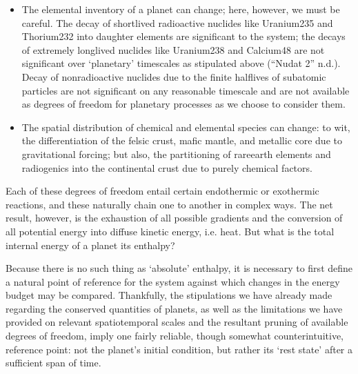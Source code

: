 \documentclass[letterpaper,10pt,english]{jupyterBook}
\begin{document}
\begin{itemize}
\item {} 
\sphinxAtStartPar
The elemental inventory of a planet can change; here, however, we must be careful. The decay of short\sphinxhyphen{}lived radioactive nuclides like Uranium\sphinxhyphen{}235 and Thorium\sphinxhyphen{}232 into daughter elements are significant to the system; the decays of extremely long\sphinxhyphen{}lived nuclides like Uranium\sphinxhyphen{}238 and Calcium\sphinxhyphen{}48 are not significant over ‘planetary’ timescales as stipulated above (“Nudat 2” n.d.). Decay of non\sphinxhyphen{}radioactive nuclides due to the finite half\sphinxhyphen{}lives of subatomic particles are not significant on any reasonable timescale and are not available as degrees of freedom for planetary processes as we choose to consider them.

\item {} 
\sphinxAtStartPar
The spatial distribution of chemical and elemental species can change: to wit, the differentiation of the felsic crust, mafic mantle, and metallic core due to gravitational forcing; but also, the partitioning of rare\sphinxhyphen{}earth elements and radiogenics into the continental crust due to purely chemical factors.

\end{itemize}

\sphinxAtStartPar
Each of these degrees of freedom entail certain endothermic or exothermic reactions, and these naturally chain one to another in complex ways. The net result, however, is the exhaustion of all possible gradients and the conversion of all potential energy into diffuse kinetic energy, i.e. heat. But what is the total internal energy of a planet \sphinxhyphen{} its enthalpy?

\sphinxAtStartPar
Because there is no such thing as ‘absolute’ enthalpy, it is necessary to first define a natural point of reference for the system against which changes in the energy budget may be compared. Thankfully, the stipulations we have already made regarding the conserved quantities of planets, as well as the limitations we have provided on relevant spatiotemporal scales and the resultant pruning of available degrees of freedom, imply one fairly reliable, though somewhat counter\sphinxhyphen{}intuitive, reference point: not the planet’s initial condition, but rather its ‘rest state’ after a sufficient span of time.
\end{document}
